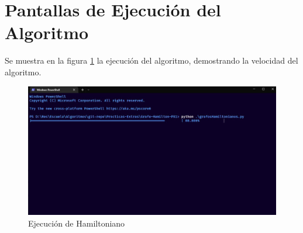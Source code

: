     
    
    \newpage
    \section{Pantallas de Ejecución del Algoritmo}
    Se muestra en la figura \ref{fig:terminal} la ejecución del algoritmo, demostrando la velocidad del algoritmo.
    
        \begin{figure}[htp!]
            \centering
            \includegraphics[width=0.8 \textwidth]{Images/Pantallas/PANTALLA.png}  
            \caption{Ejecución de Hamiltoniano}
            \label{fig:terminal}
        \end{figure}
    